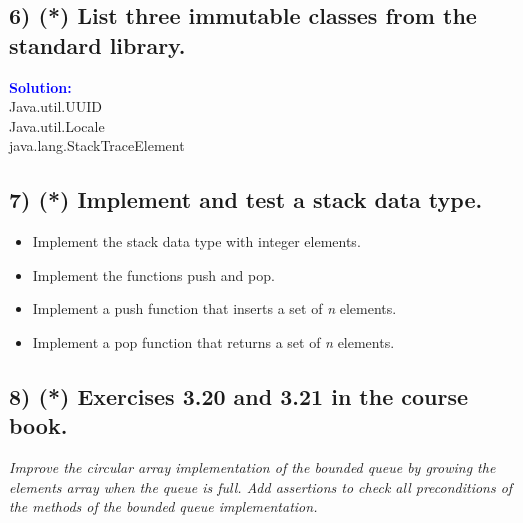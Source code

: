 \documentclass{article}
\begin{document}
\subsection*{6) (*) List three immutable classes from the standard library.}
\indent \textbf{\textcolor{blue}{Solution:}} \\
\textcolor{MycolorOrange}{Java.util.UUID} \\
\textcolor{MycolorOrange}{Java.util.Locale} \\
\textcolor{MycolorOrange}{java.lang.StackTraceElement} \\


\subsection*{7) (*) Implement and test a stack data type.}
\begin{itemize}
    \item Implement the stack data type with integer elements.
    \item Implement the functions push and pop.
    \item Implement a push function that inserts a set of \textit{n} elements.
    \item Implement a pop function that returns a set of \textit{n} elements.
\end{itemize}
\subsection*{8) (*) Exercises 3.20 and 3.21 in the course book.}
\textit{Improve the circular array implementation of the
bounded queue by growing the elements array when the queue is full. Add assertions to check
all preconditions of the methods of the bounded queue implementation.}\\

\newpage

\end{document}
